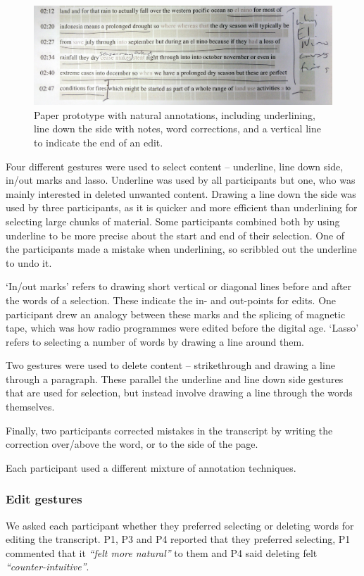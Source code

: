 \begin{figure}[h]
  \centering
  \includegraphics[width=\columnwidth]{figs/mockup-cropped}
  \caption{Paper prototype with natural annotations, including
    underlining, line down the side with notes, word corrections, and a
    vertical line to indicate the end of an edit.}
  \label{fig:natural}
\end{figure}

Four different gestures were used to select content -- underline, line down side, in/out marks and lasso.  Underline
was used by all participants but one, who was mainly interested in deleted unwanted content.  Drawing a line down the
side was used by three participants, as it is quicker and more efficient than underlining for selecting large chunks of
material.  Some participants combined both by using underline to be more precise about the start and end of their
selection.  One of the participants made a mistake when underlining, so scribbled out the underline to undo it.

`In/out marks' refers to drawing short vertical or diagonal lines before and after the words of a selection. These
indicate the in- and out-points for edits. One participant drew an analogy between these marks and the splicing of
magnetic tape, which was how radio programmes were edited before the digital age. `Lasso' refers to selecting a number
of words by drawing a line around them.

Two gestures were used to delete content -- strikethrough and drawing a line through a paragraph. These parallel the
underline and line down side gestures that are used for selection, but instead involve drawing a line through the words
themselves.

Finally, two participants corrected mistakes in the transcript by writing the correction over/above the
word, or to the side of the page.

Each participant used a different mixture of annotation techniques.

\subsubsection{Edit gestures}\label{sec:paper-proto-edit-gestures}
We asked each participant whether they preferred selecting or deleting words for editing the transcript.  P1, P3 and P4
reported that they preferred selecting, P1 commented that it \textit{``felt more natural''} to them and P4 said
deleting felt \textit{``counter-intuitive''}.

